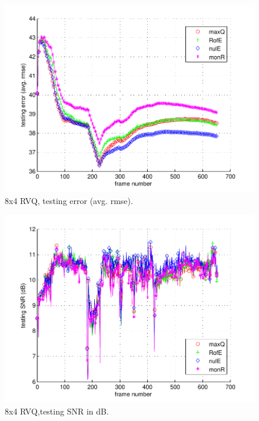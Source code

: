 								\begin{figure}[h!]
								\centering
								\includegraphics[height=0.4\textheight]{thesis/6_car4_8_4_1000_tst_armse.pdf}
								\caption{8x4 RVQ, testing error (avg. rmse).}
								\label{fig:6_car4_8_4_1000_tst_armse}
								\end{figure}

								\begin{figure}[h!]
								\centering
								\includegraphics[height=0.4\textheight]{thesis/6_car4_8_4_1000_tst_SNRdB.pdf}
								\caption{8x4 RVQ,testing SNR in dB.}
								\label{fig:6_car4_8_4_1000_tst_SNRdB}
								\end{figure}
